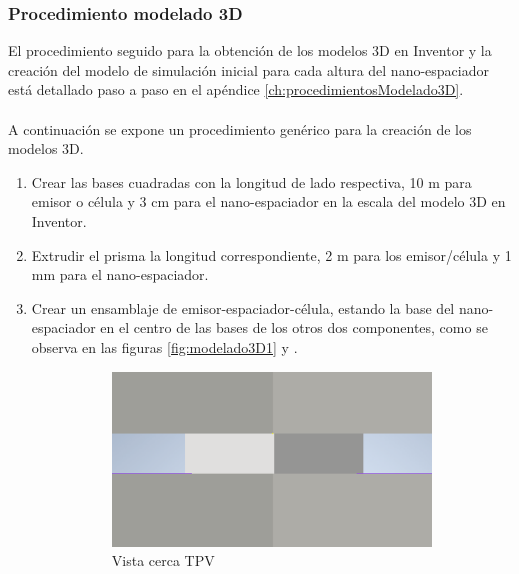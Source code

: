 \subsubsection{Procedimiento modelado 3D}
El procedimiento seguido para la obtención de los modelos 3D en Inventor y la creación del modelo de simulación inicial para cada altura del nano-espaciador está detallado paso a paso en el apéndice \ref{ch:procedimientosModelado3D}.\\\\ A continuación se expone un procedimiento genérico para la creación de los modelos 3D.
\begin{enumerate}
	\item Crear las bases cuadradas con la longitud de lado respectiva, 10 m para emisor o célula y 3 cm para el nano-espaciador en la escala del modelo 3D en Inventor. 
	\item Extrudir el prisma la longitud correspondiente, 2 m para los emisor/célula y 1 mm para el nano-espaciador.
	\item Crear un ensamblaje de emisor-espaciador-célula, estando la base del nano-espaciador en el centro de las bases de los otros dos componentes, como se observa en las figuras \ref{fig:modelado3D1}  y .
\begin{figure}[H]
	\centering
	\begin{subfigure}[b]{0.4\textwidth}
		\centering
			\includegraphics[width=1.00\textwidth]{figuras/Procedimiento_Simulaciones/Conduccion/modelado3D_cerca.png}
		\caption{Vista cerca TPV}
		\label{fig:modelado3D_cerca1}
	\end{subfigure}
	\hfill
	\begin{subfigure}[b]{0.4\textwidth}
		\centering

\end{subfigure}
\end{figure}
\end{enumerate}
